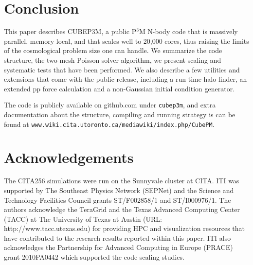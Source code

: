 \section{Conclusion}

This paper describes {\small CUBEP3M}, a public P$^3$M N-body code that is massively parallel, memory local, 
and that scales well to 20,000 cores, thus raising the limits of the cosmological problem size one can handle.
We summarize the code structure, the two-mesh Poisson solver algorithm, we present scaling and systematic tests
that have been performed. We also describe a few utilities and extensions that come with the public release, 
including a run time halo finder, an extended pp force calculation and a non-Gaussian initial condition generator.

The code is publicly available on github.com under {\tt cubep3m}, and extra documentation about the structure, 
compiling and running strategy is can be found at {\tt www.wiki.cita.utoronto.ca/mediawiki/index.php/CubePM}.

\section*{Acknowledgements}

The CITA256 simulations were run on the Sunnyvale cluster at CITA.
ITI was supported by The Southeast Physics
Network (SEPNet) and the Science and Technology Facilities Council
grants ST/F002858/1 and ST/I000976/1. The authors acknowledge the
TeraGrid and the Texas Advanced Computing Center (TACC) at The
University of Texas at Austin (URL: http://www.tacc.utexas.edu) for
providing HPC and visualization resources that have contributed to the
research results reported within this paper. ITI also acknowledges the Partnership for Advanced
Computing in Europe (PRACE) grant 2010PA0442 which supported the code
scaling studies. 